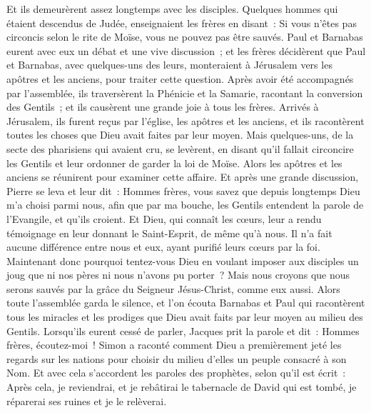 \begin{multicols}{2}
Et ils demeurèrent assez longtemps avec les disciples.
\VerseOne{}Quelques hommes qui étaient descendus de Judée, enseignaient les frères en disant~: Si vous n'êtes pas circoncis selon le rite de Moïse, vous ne pouvez pas être sauvés.
Paul et Barnabas eurent avec eux un débat et une vive discussion~; et les frères décidèrent que Paul et Barnabas, avec quelques-uns des leurs, monteraient à Jérusalem vers les apôtres et les anciens, pour traiter cette question.
Après avoir été accompagnés par l'assemblée, ils traversèrent la Phénicie et la Samarie, racontant la conversion des Gentils~; et ils causèrent une grande joie à tous les frères.
Arrivés à Jérusalem, ils furent reçus par l'église, les apôtres et les anciens, et ils racontèrent toutes les choses que Dieu avait faites par leur moyen.
Mais quelques-uns, de la secte des pharisiens qui avaient cru, se levèrent, en disant qu'il fallait circoncire les Gentils et leur ordonner de garder la loi de Moïse.
Alors les apôtres et les anciens se réunirent pour examiner cette affaire.
Et après une grande discussion, Pierre se leva et leur dit~: Hommes frères, vous savez que depuis longtemps Dieu m'a choisi parmi nous, afin que par ma bouche, les Gentils entendent la parole de l'Evangile, et qu'ils croient.
Et Dieu, qui connaît les cœurs, leur a rendu témoignage en leur donnant le Saint-Esprit, de même qu'à nous.
Il n'a fait aucune différence entre nous et eux, ayant purifié leurs cœurs par la foi.
Maintenant donc pourquoi tentez-vous Dieu en voulant imposer aux disciples un joug que ni nos pères ni nous n'avons pu porter~?
Mais nous croyons que nous serons sauvés par la grâce du Seigneur Jésus-Christ, comme eux aussi.
Alors toute l'assemblée garda le silence, et l'on écouta Barnabas et Paul qui racontèrent tous les miracles et les prodiges que Dieu avait faits par leur moyen au milieu des Gentils.
Lorsqu'ils eurent cessé de parler, Jacques prit la parole et dit~: Hommes frères, écoutez-moi~!
Simon a raconté comment Dieu a premièrement jeté les regards sur les nations pour choisir du milieu d'elles un peuple consacré à son Nom. 
Et avec cela s'accordent les paroles des prophètes, selon qu'il est écrit~:
Après cela, je reviendrai, et je rebâtirai le tabernacle de David qui est tombé, je réparerai ses ruines et je le relèverai.

\end{multicols}
